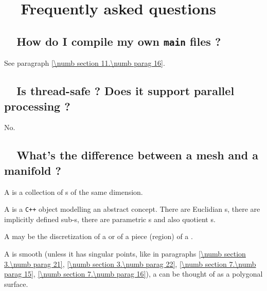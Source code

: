 
\chapter {~~{Frequently asked questions}}\label{\numb section 13}

\section{~~How do I compile my own {\tt main} files ?}\label{\numb section 13.\numb parag 1}

See paragraph \ref{\numb section 11.\numb parag 16}.


\section{~~Is {\maniFEM} thread-safe ? Does it support parallel processing ?}
\label{\numb section 13.\numb parag 2}

No.


\section{~~What's the difference between a mesh and a manifold ?}
\label{\numb section 13.\numb parag 3}

A {\small\tt{}} is a collection of {\small\tt{}}s of the
same dimension.

A {\small\tt{}} is a {\tt C++} object modelling an abstract concept.
There are Euclidian {\small\tt{}}s, there are implicitly defined
sub-{\small\tt{}}s, there are parametric {\small\tt{}}s
and also quotient {\small\tt{}}s.

A {\small\tt{}} may be the discretization of a {\small\tt{}}
or of a piece (region) of a {\small\tt{}}.

A {\small\tt{}} is smooth (unless it has singular points, like in 
paragraphs \ref{\numb section 3.\numb parag 21}, \ref{\numb section 3.\numb parag 22},
\ref{\numb section 7.\numb parag 15}, \ref{\numb section 7.\numb parag 16}),
a {\small\tt{}} can be thought of as a polygonal surface.

